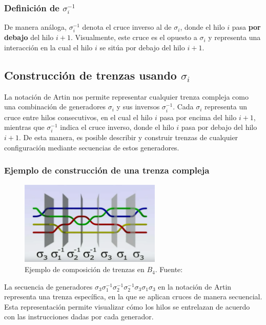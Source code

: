 \subsubsection*{Definición de \(\sigma_i^{-1}\)}

De manera análoga, \(\sigma_i^{-1}\) denota el cruce inverso al de \(\sigma_i\), donde el hilo \(i\) pasa \textbf{por debajo} del hilo \(i+1\). Visualmente, este cruce es el opuesto a \(\sigma_i\) y representa una interacción en la cual el hilo \(i\) se sitúa por debajo del hilo \(i+1\).

\subsection{Construcción de trenzas usando \(\sigma_i\)}

La notación de Artin nos permite representar cualquier trenza compleja como una combinación de generadores \(\sigma_i\) y sus inversos \(\sigma_i^{-1}\). Cada \(\sigma_i\) representa un cruce entre hilos consecutivos, en el cual el hilo \(i\) pasa por encima del hilo \(i+1\), mientras que \(\sigma_i^{-1}\) indica el cruce inverso, donde el hilo \(i\) pasa por debajo del hilo \(i+1\). De esta manera, es posible describir y construir trenzas de cualquier configuración mediante secuencias de estos generadores.

\subsubsection*{Ejemplo de construcción de una trenza compleja}

\begin{figure}[h!]
    \centering
    \includegraphics[width=0.6\textwidth]{figures/chapters/2_artin/descomposicion_trenza.png}
    \caption{Ejemplo de composición de trenzas en $B_4$. Fuente: \cite{esterdalvitBraidsChapter12013}}
    \label{fig:elemento_inverso_proceso}
\end{figure}

La secuencia de generadores \(\sigma_3 \sigma_1^{-1} \sigma_2^{-1} \sigma_2^{-1} \sigma_3 \sigma_1 \sigma_3\) en la notación de Artin representa una trenza específica, en la que se aplican cruces de manera secuencial. Esta representación permite visualizar cómo los hilos se entrelazan de acuerdo con las instrucciones dadas por cada generador.


